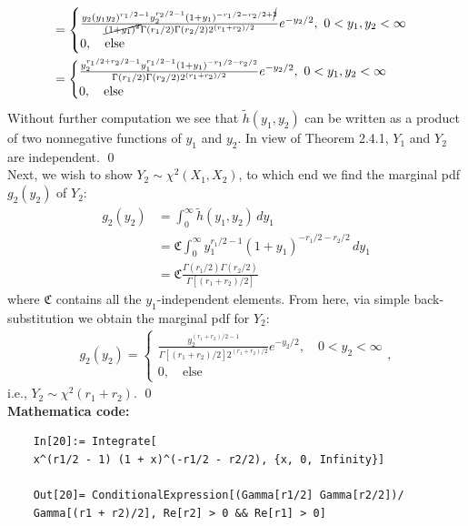 \documentclass{book}
\theoremstyle{definition}
\newcommand{\nn}{\nonumber}
\newcommand{\Else}{\text{else}}
\newcommand{\f}[2]{\frac{#1}{#2}}
\begin{document}
\begin{enumerate}[(a)]
\begin{align}
	&= \begin{cases}
	\f{y_2(y_1y_2)^{r_1/2-1}y_2^{r_2/2-1} (1+y_1)^{-r_1/2-r_2/2 + \cancel{ 2}}}{\cancel{(1+y_1)^2}\Gamma(r_1/2)\Gamma(r_2/2)2^{(r_1+r_2)/2}}e^{-y_2/2}, \,\, 0 < y_1,y_2 < \infty\\
	0, \quad \text{else}
	\end{cases}\nn\\
	&= \begin{cases}
	\f{y_2^{r_1/2+r_2/2-1}y_1^{r_1/2-1}(1+y_1)^{-r_1/2-r_2/2}}{\Gamma(r_1/2)\Gamma(r_2/2)2^{(r_1+r_2)/2}}e^{-y_2/2}, \,\, 0 < y_1,y_2 < \infty\\
	0, \quad \text{else}
	\end{cases}
	\end{align}
	Without further computation we see that $\tilde{h}(y_1,y_2)$ can be written as a product of two nonnegative functions of $y_1$ and $y_2$. In view of Theorem 2.4.1, $Y_1$ and $Y_2$ are independent. \qed \\
	
	Next, we wish to show $Y_2 \sim \chi^2(X_1, X_2)$, to which end we find the marginal pdf $g_2(y_2)$ of $Y_2$:
	\begin{align}
	g_2(y_2) &= \int^\infty_0 \tilde{h}(y_1,y_2)\,dy_1\nn\\
	&= \mathfrak{C}\int^\infty_0 {y_1^{r_1/2-1}(1+y_1)^{-r_1/2-r_2/2}}\,dy_1\nn\\
	&= \mathfrak{C}\f{\Gamma(r_1/2)\Gamma(r_2/2)}{\Gamma[(r_1+r_2)/2]}
	\end{align}
	where $\mathfrak{C}$ contains all the $y_1$-independent elements. From here, via simple back-substitution we obtain the marginal pdf for  $Y_2$:
	\begin{align}
	g_2(y_2) = \begin{cases}
	\f{y_2^{(r_1+r_2)/2 - 1 }}{\Gamma[(r_1+r_2)/2]2^{(r_1+r_2)/2}}e^{-y_2/2}, \quad 0 < y_2 < \infty\\
	0, \quad \Else
	\end{cases},
	\end{align}
	i.e., $Y_2 \sim \chi^2(r_1 + r_2)$. \qed\\
	
	\textbf{Mathematica code:}
	\begin{lstlisting}
	In[20]:= Integrate[
	x^(r1/2 - 1) (1 + x)^(-r1/2 - r2/2), {x, 0, Infinity}]
	
	Out[20]= ConditionalExpression[(Gamma[r1/2] Gamma[r2/2])/
	Gamma[(r1 + r2)/2], Re[r2] > 0 && Re[r1] > 0]
	\end{lstlisting}
	

\end{enumerate}
\end{document}
